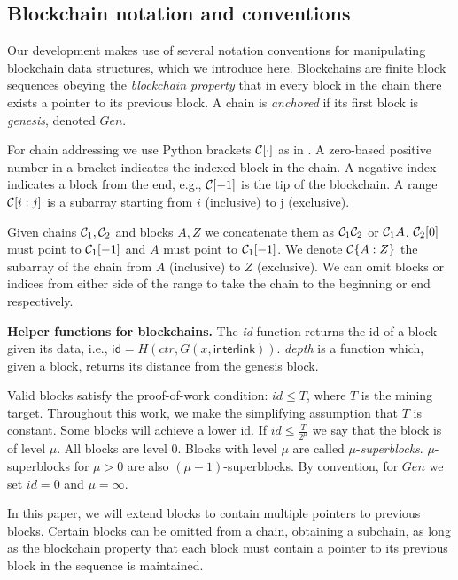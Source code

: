 \subsection{Blockchain notation and conventions}
Our development makes use of several notation conventions for manipulating blockchain data structures, which we introduce here.
Blockchains are finite block sequences obeying the \textit{blockchain property}
that in every block in the chain there exists a pointer to its previous block.
A chain is \textit{anchored} if its first block is \textit{genesis}, denoted
$Gen$.

For chain addressing we use Python brackets $\mathcal{C}[\cdot]$ as in
\cite{fruitchains}. A zero-based positive number in a bracket indicates the
indexed block in the chain. A negative index indicates a block from the end,
e.g., $\mathcal{C}[-1]$ is the tip of the blockchain. A range $\mathcal{C}[i:j]$ is a
subarray starting from $i$ (inclusive) to j (exclusive).

Given chains $\mathcal{C}_1, \mathcal{C}_2$ and blocks $A, Z$ we concatenate them as
$\mathcal{C}_1 \mathcal{C}_2$ or $\mathcal{C}_1 A$. $\mathcal{C}_2[0]$ must point to $\mathcal{C}_1[-1]$
and $A$ must point to $\mathcal{C}_1[-1]$. We denote $\mathcal{C}\{A:Z\}$ the subarray of
the chain from $A$ (inclusive) to $Z$ (exclusive). We can omit blocks or indices
from either side of the range to take the chain to the beginning or end
respectively.

\textbf{Helper functions for blockchains.} The \textit{id} function returns the
id of a block given its data, i.e., $\textsf{id} = H(ctr, G(x,
\textsf{interlink}))$. %
 \textit{depth} is a function which, given a block, returns
its distance from the genesis block.

Valid blocks satisfy the proof-of-work condition: $id \leq T$, where $T$ is the
mining target. Throughout this work, we make the simplifying assumption that $T$
is constant. Some blocks will achieve a lower id. If $id \leq \frac{T}{2^\mu}$
we say that the block is of level $\mu$. All blocks are level $0$. Blocks with
level $\mu$ are called $\mu$-\textit{superblocks}.
$\mu$-superblocks for $\mu > 0$ are also $(\mu - 1)$-superblocks.
By convention, for $Gen$ we set $id = 0$ and $\mu = \infty$.

In this paper, we will extend blocks to contain multiple pointers to previous
blocks. Certain blocks can be omitted from a chain, obtaining a subchain, as
long as the blockchain property that each block must contain a pointer to its
previous block in the sequence is maintained.

